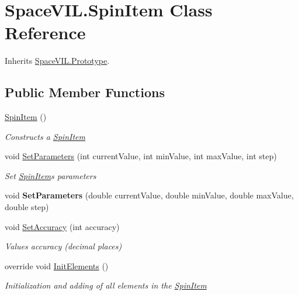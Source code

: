 \hypertarget{class_space_v_i_l_1_1_spin_item}{}\section{Space\+V\+I\+L.\+Spin\+Item Class Reference}
\label{class_space_v_i_l_1_1_spin_item}


Inherits \mbox{\hyperlink{class_space_v_i_l_1_1_prototype}{Space\+V\+I\+L.\+Prototype}}.

\subsection*{Public Member Functions}
\begin{DoxyCompactItemize}
\item 
\mbox{\hyperlink{class_space_v_i_l_1_1_spin_item_aad1c32a29142563435b0b222d320fc99}{Spin\+Item}} ()
\begin{DoxyCompactList}\small\item\em Constructs a \mbox{\hyperlink{class_space_v_i_l_1_1_spin_item}{Spin\+Item}} \end{DoxyCompactList}\item 
void \mbox{\hyperlink{class_space_v_i_l_1_1_spin_item_a34da95698ef1ccaf2996afaab479d89a}{Set\+Parameters}} (int current\+Value, int min\+Value, int max\+Value, int step)
\begin{DoxyCompactList}\small\item\em Set \mbox{\hyperlink{class_space_v_i_l_1_1_spin_item}{Spin\+Item}}\textquotesingle{}s parameters \end{DoxyCompactList}\item 
\mbox{\label{class_space_v_i_l_1_1_spin_item_a2833c34bd9d98ca4d37e347ccd9b582a}} 
void {\bfseries Set\+Parameters} (double current\+Value, double min\+Value, double max\+Value, double step)
\item 
void \mbox{\hyperlink{class_space_v_i_l_1_1_spin_item_a75968056339e587c2e163b50b1ec0be2}{Set\+Accuracy}} (int accuracy)
\begin{DoxyCompactList}\small\item\em Values accuracy (decimal places) \end{DoxyCompactList}\item 
override void \mbox{\hyperlink{class_space_v_i_l_1_1_spin_item_aad67ed66e70bac7de49fbe0f7271d0a1}{Init\+Elements}} ()
\begin{DoxyCompactList}\small\item\em Initialization and adding of all elements in the \mbox{\hyperlink{class_space_v_i_l_1_1_spin_item}{Spin\+Item}} \end{DoxyCompactList}\item 

\end{DoxyCompactItemize}
